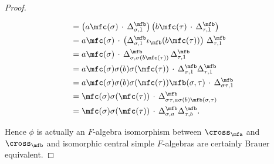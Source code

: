 \begin{proof}
\begin{enumerate}
\[\begin{aligned}
              &= \left(
                a\mfc(\sigma)
                \, \cdot \,
                \Delta^{\mfb}_{\sigma, 1}
                \right)
                \left(
                b \mfc(\tau)
                \, \cdot \,
                \Delta^{\mfb}_{\tau, 1}
                \right)\\
              &= a\mfc(\sigma) \, \cdot \,
                \left(\Delta^{\mfb}_{\sigma, 1}
                \iota_{\mfb}(b\mfc(\tau))\right) \,
                \Delta^{\mfb}_{\tau, 1} \\
              &=
                a\mfc(\sigma) \, \cdot \,
                \Delta^{\mfb}_{\sigma, \sigma(b\mfc(\tau))}\,
                \Delta^{\mfb}_{\tau, 1} \\
              &= a\mfc(\sigma)\sigma(b)\sigma(\mfc(\tau)) \, \cdot \,
                \Delta^{\mfb}_{\sigma, 1}\Delta_{\tau, 1}^{\mfb}\\
              &= a\mfc(\sigma)\sigma(b)\sigma(\mfc(\tau))\mfb(\sigma,\tau) \, \cdot \, \Delta^{\mfb}_{\sigma\tau, 1}\\
              &= \mfc(\sigma)\sigma(\mfc(\tau)) \, \cdot \, \Delta^{\mfb}_{\sigma\tau, a\sigma(b)\mfb(\sigma,\tau)}\\
              &= \mfc(\sigma)\sigma(\mfc(\tau)) \, \cdot \, \Delta^{\mfb}_{\sigma, a}\Delta^{\mfb}_{\tau, b}.
            \end{aligned}
            \]
    \end{enumerate}
    Hence $\phi$ is actually an $F$-algebra isomorphism between $\cross_{\mfa}$ and $\cross_{\mfb}$ and isomorphic central simple $F$-algebras are certainly Brauer equivalent.
  \end{proof}



